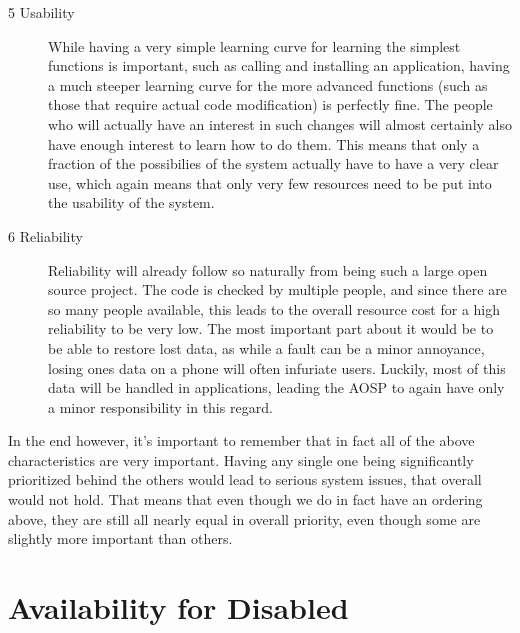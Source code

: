 \documentclass[conference]{IEEEtran}
\begin{document}
\begin{description}
\item[5 Usability] While having a very simple learning curve for learning the simplest functions is important, such as calling and installing an application, having a much steeper learning curve for the more advanced functions (such as those that require actual code modification) is perfectly fine. The people who will actually have an interest in such changes will almost certainly also have enough interest to learn how to do them. This means that only a fraction of the possibilies of the system actually have to have a very clear use, which again means that only very few resources need to be put into the usability of the system.
\item[6 Reliability] Reliability will already follow so naturally from being such a large open source project. The code is checked by multiple people, and since there are so many people available, this leads to the overall resource cost for a high reliability to be very low. The most important part about it would be to be able to restore lost data, as while a fault can be a minor annoyance, losing ones data on a phone will often infuriate users. Luckily, most of this data will be handled in applications, leading the AOSP to again have only a minor responsibility in this regard. 
\end{description}

In the end however, it's important to remember that in fact all of the above characteristics are very important. Having any single one being significantly prioritized behind the others would lead to serious system issues, that overall would not hold. That means that even though we do in fact have an ordering above, they are still all nearly equal in overall priority, even though some are slightly more important than others. 

\section{Availability for Disabled}
\label{availability}

\end{document}
